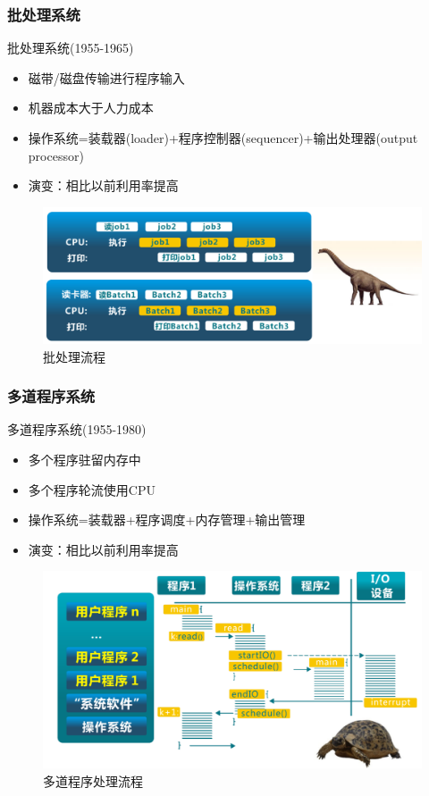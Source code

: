 \documentclass[UTF8]{ctexbeamer}
\begin{document}
\begin{frame}
	
	\frametitle{批处理系统}
	
	批处理系统(1955-1965)
	\begin{itemize}
		\item 磁带/磁盘传输进行程序输入
		\item 机器成本大于人力成本	
		\item 操作系统=装载器(loader)+程序控制器(sequencer)+输出处理器(output processor)
		\item 演变：相比以前利用率提高
	\end{itemize}
	
	\begin{figure}
		\centering
		\includegraphics[width=0.6\linewidth]{history-batch-process-graph}
		\caption{批处理流程}
	\end{figure}
	
\end{frame}




\begin{frame}
	
	\frametitle{多道程序系统}
	
	多道程序系统(1955-1980)
	\begin{itemize}
		\item 多个程序驻留内存中
		\item 多个程序轮流使用CPU	
		\item 操作系统=装载器+程序调度+内存管理+输出管理
		\item 演变：相比以前利用率提高
	\end{itemize}
	
	\begin{figure}
		\centering
		\includegraphics[width=0.7\linewidth]{history-multiprogramming}
		\caption{多道程序处理流程}
	\end{figure}
	
\end{frame}
\end{document}

